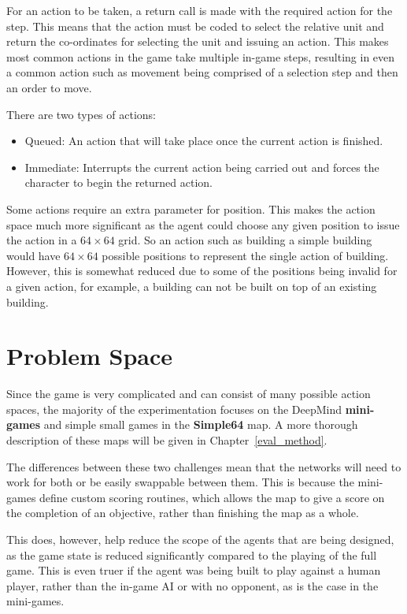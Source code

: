 For an action to be taken, a return call is made with the required action for
the step. This means that the action must be coded to select the relative unit
and return the co-ordinates for selecting the unit and issuing an action. This
makes most common actions in the game take multiple in-game steps, resulting in
even a common action such as movement being comprised of a selection step and
then an order to move.

There are two types of actions:

\begin{itemize}
    \item Queued: An action that will take place once the current
        action is finished.
    \item Immediate: Interrupts the current action being carried out and
        forces the character to begin the returned action.
\end{itemize}

Some actions require an extra parameter for position. This makes the action
space much more significant as the agent could choose any given position to
issue the action in a $64 \times 64$ grid. So an action such as building a
simple building would have $64 \times 64$ possible positions to represent the
single action of building. However, this is somewhat reduced due to some of the
positions being invalid for a given action, for example, a building can not be
built on top of an existing building.

\section{Problem Space}
Since the game is very complicated and can consist of many possible action spaces,
the majority of the experimentation focuses on the DeepMind \textbf{mini-games}
and simple small games in the \textbf{Simple64} map. A more thorough description
of these maps will be given in Chapter~\ref{eval_method}.

The differences between these two challenges mean that the networks will need to
work for both or be easily swappable between them. This is because the
mini-games define custom scoring routines, which allows the map to give a score
on the completion of an objective, rather than finishing the map as a whole.

This does, however, help reduce the scope of the agents that are being designed,
as the game state is reduced significantly compared to the playing of the full
game. This is even truer if the agent was being built to play against a human
player, rather than the in-game AI or with no opponent, as is the case in the
mini-games.


